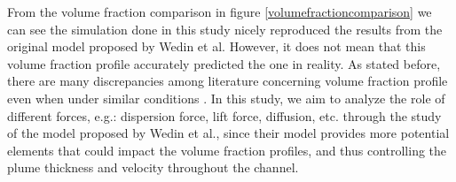 From the volume fraction comparison in figure \ref{volumefractioncomparison} we can see the simulation done in this study nicely reproduced the results from the original model proposed by Wedin et al. However, it does not mean that this volume fraction profile accurately predicted the one in reality. As stated before, there are many discrepancies among literature concerning volume fraction profile even when under similar conditions \cite{abdelouahed2014hydrodynamics, Mat2005, philippe2005modelling}. In this study, we aim to analyze the role of different forces, e.g.: dispersion force, lift force, diffusion, etc. through the study of the model proposed by Wedin et al., since their model provides more potential elements that could impact the volume fraction profiles, and thus controlling the plume thickness and velocity throughout the channel.

